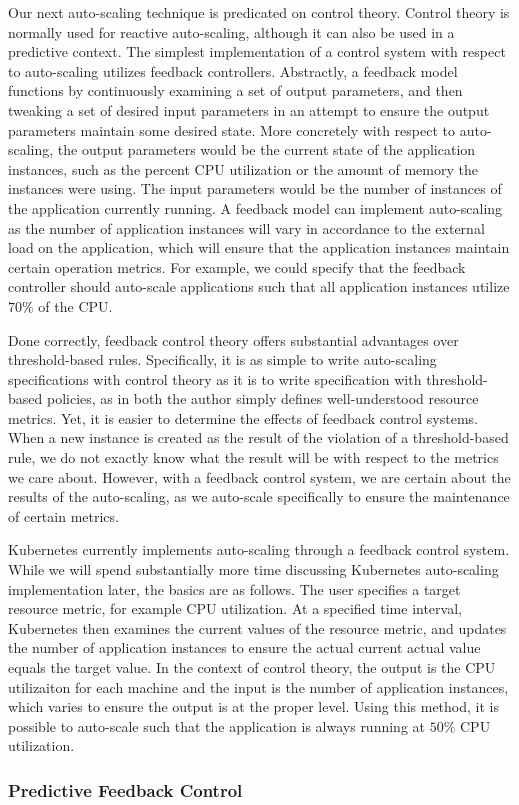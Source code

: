 Our next auto-scaling technique is predicated on control
theory. Control theory is normally used for reactive auto-scaling, although it
can also be used in a predictive context. The simplest implementation of a
control system with respect to auto-scaling utilizes feedback
controllers.\cite[pg.
25]{auto-scaling-techniques-for-elastic-applications-in-cloud-environments}
Abstractly, a feedback model functions by continuously examining a set of output parameters,
and then tweaking a set of desired input parameters in an attempt to ensure the
output parameters maintain some desired state. More concretely with respect to
auto-scaling, the output parameters would be the current state of the
application instances, such as the percent CPU utilization or the amount of
memory the instances were using. The input parameters would be the
number of instances of the application currently running. A feedback model
can implement auto-scaling as the number of application instances will vary in
accordance to the external load on the application, which will ensure that the
application instances maintain certain operation metrics. For example, we could
specify that the feedback controller should auto-scale applications such that
all application instances utilize $70\%$ of the CPU.

Done correctly, feedback control theory offers substantial advantages over
threshold-based rules. Specifically, it is as simple to write auto-scaling
specifications with control theory as it is to write specification with
threshold-based policies, as in both the author simply defines well-understood
resource metrics. Yet, it is easier to determine the effects of feedback
control systems. When a new instance is created as the result of the violation
of a threshold-based rule, we do not exactly know what the result will be with
respect to the metrics we care about. However, with a feedback control system,
we are certain about the results of the auto-scaling, as we auto-scale
specifically to ensure the maintenance of certain metrics.

Kubernetes currently implements auto-scaling through a feedback control system.
While we will spend substantially more time discussing Kubernetes auto-scaling
implementation later, the basics are as follows. The user specifies a target resource
metric, for example CPU utilization. At a specified time interval,
Kubernetes then examines the current values
of the resource metric, and updates the number of application instances to
ensure the actual current actual value equals the target
value.\cite{k8s-horizontal-pod-autoscaler-proposal} In the context of control
theory, the output is the CPU utilizaiton for each machine and the input is the
number of application instances, which varies to ensure the output is at the
proper level. Using this method, it is possible to auto-scale such that the
application is always running at $50\%$ CPU utilization.

\subsubsection{Predictive Feedback Control}


